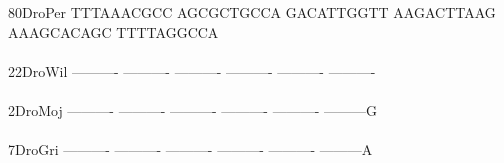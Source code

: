 \documentclass[11pt,twoside,reqno,a4paper]{article}
\begin{document}
{80\hspace*{3\charwidth}DroPer	TTTAAACGCC	AGCGCTGCCA	GACATTGGTT	AAGACTTAAG	AAAGCACAGC	TTTTAGGCCA	\\
\hspace*{5\charwidth}\hspace*{7\charwidth}\hspace*{1\charwidth}\hspace*{1\charwidth}\hspace*{1\charwidth}\hspace*{1\charwidth}\hspace*{1\charwidth}\hspace*{1\charwidth}\\
22\hspace*{3\charwidth}DroWil	----------	----------	----------	----------	----------	----------	\\
\hspace*{5\charwidth}\hspace*{7\charwidth}\hspace*{1\charwidth}\hspace*{1\charwidth}\hspace*{1\charwidth}\hspace*{1\charwidth}\hspace*{1\charwidth}\hspace*{1\charwidth}\\
2\hspace*{4\charwidth}DroMoj	----------	----------	----------	----------	----------	---------G	\\
\hspace*{5\charwidth}\hspace*{7\charwidth}\hspace*{1\charwidth}\hspace*{1\charwidth}\hspace*{1\charwidth}\hspace*{1\charwidth}\hspace*{1\charwidth}\hspace*{1\charwidth}\\
7\hspace*{4\charwidth}DroGri	----------	----------	----------	----------	----------	---------A	\\
\hspace*{5\charwidth}\hspace*{7\charwidth}\hspace*{1\charwidth}\hspace*{1\charwidth}\hspace*{1\charwidth}\hspace*{1\charwidth}\hspace*{1\charwidth}\hspace*{1\charwidth}\\
}
\end{document}
